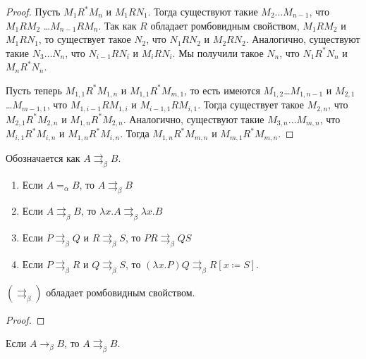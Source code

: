 \begin{proof}
    Пусть $M_1 R^{*} M_n$ и $M_1 R N_1$. Тогда существуют такие $M_2 \ldots M_{n-1}$, что $M_1 R M_2$ \ldots $M_{n-1} R M_n$.
    Так как $R$ обладает ромбовидным свойством, $M_1 R M_2$ и $M_1 R N_1$, то существует такое $N_2$,
    что $N_1 R N_2$ и $M_2 R N_2$. Аналогично, существуют такие $N_3 \ldots N_n$, что $N_{i-1} R N_{i}$ и $M_i R N_i$.
    Мы получили такое $N_n$, что $N_1 R^{*} N_n$ и $M_n R^{*} N_n$.

    Пусть теперь $M_{1,1}R^{*}M_{1,n}$ и $M_{1,1}R^{*}M_{m,1}$, то есть имеются $M_{1,2}$\ldots$M_{1,n-1}$ и $M_{2,1}$\ldots$M_{m-1,1}$,
    что $M_{1,i-1} R M_{1,i}$ и $M_{i-1, 1} R M_{i, 1}$.
    Тогда существует такое $M_{2,n}$, что $M_{2,1} R^{*} M_{2,n}$ и $M_{1,n} R^{*} M_{2,n}$.
    Аналогично, существуют такие $M_{3,n}\ldots M_{m,n}$, что $M_{i,1} R^{*} M_{i,n}$ и $M_{1,n} R^{*} M_{i,n}$.
    Тогда $M_{1,n} R^{*} M_{m,n}$ и $M_{m,1} R^{*} M_{m,n}$.
\end{proof}

\begin{definition}
    Обозначается как $A \rightrightarrows_{\beta} B$.
    \begin{enumerate}
        \item Если $A =_\alpha B$, то $A \rightrightarrows_{\beta}B$
        \item Если $A \rightrightarrows_{\beta} B$, то $\lambda x.A \rightrightarrows_{\beta} \lambda x . B$
        \item Если $P \rightrightarrows_{\beta} Q$ и $R \rightrightarrows_{\beta} S$, то $PR \rightrightarrows_{\beta} QS$
        \item Если $P \rightrightarrows_{\beta}R$ и $Q \rightrightarrows_{\beta} S$,
            то $(\lambda x . P) Q \rightrightarrows_{\beta} R [x\coloneqq{}S]$.
    \end{enumerate}
\end{definition}

\begin{statement} \label{st-star}
    $(\rightrightarrows_{\beta})$ обладает ромбовидным свойством.
\end{statement}

\begin{proof}
    \todo %
\end{proof}

\begin{statement} \label{st-A}
    Если $A \to_{\beta} B$, то $A \rightrightarrows_{\beta} B$.
\end{statement}

